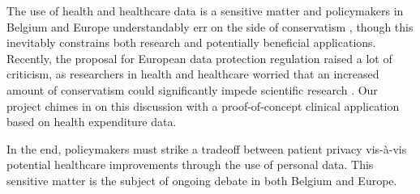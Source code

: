 The use of health and healthcare data is a sensitive matter and policymakers in Belgium and Europe understandably err on the side of conservatism \citep{privacywet, eu_data}, though this inevitably constrains both research and potentially beneficial applications. Recently, the proposal for European data protection regulation raised a lot of criticism, as researchers in health and healthcare worried that an increased amount of conservatism could significantly impede scientific research \citep{feam_2, cumbley2013big, fears2014data, wellcome_position_statement, feam_1}. Our project chimes in on this discussion with a proof-of-concept clinical application based on health expenditure data.

In the end, policymakers must strike a tradeoff between patient privacy vis-\`a-vis potential healthcare improvements through the use of personal data. This sensitive matter is the subject of ongoing debate in both Belgium and Europe. 




\cleardoublepage

